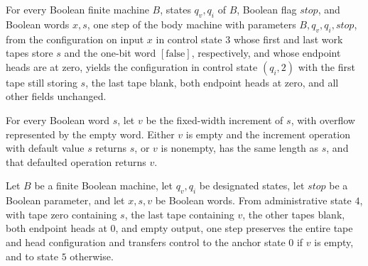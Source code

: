 \begin{lemma}
\label{Complexity.enumCont_body_reject}
\leanok
{}
For every Boolean finite machine $B$, states $q_v,q_i$ of $B$, Boolean flag $stop$, and
Boolean words $x,s$, one step of the body machine with parameters $B,q_v,q_i,stop$, from
the configuration on input $x$ in control state $3$ whose first and last work tapes
store $s$ and the one-bit word $[\mathrm{false}]$, respectively, and whose endpoint
heads are at zero, yields the configuration in control state $(q_i,2)$ with the first
tape still storing $s$, the last tape blank, both endpoint heads at zero, and all other
fields unchanged.
\end{lemma}

\begin{lemma}
\label{Complexity.enumCont_increment_cases}
\leanok
{}
For every Boolean word $s$, let $v$ be the fixed-width increment of $s$, with overflow
represented by the empty word. Either $v$ is empty and the increment operation with
default value $s$ returns $s$, or $v$ is nonempty, has the same length as $s$, and that
defaulted operation returns $v$.
\end{lemma}

\begin{lemma}
\label{Complexity.enumCont_body_check}
\leanok
{}
Let $B$ be a finite Boolean machine, let $q_v,q_i$ be designated states, let $stop$ be a
Boolean parameter, and let $x,s,v$ be Boolean words. From administrative state $4$, with
tape zero containing $s$, the last tape containing $v$, the other tapes blank, both
endpoint heads at $0$, and empty output, one step preserves the entire tape and head
configuration and transfers control to the anchor state $0$ if $v$ is empty, and to
state $5$ otherwise.
\end{lemma}

